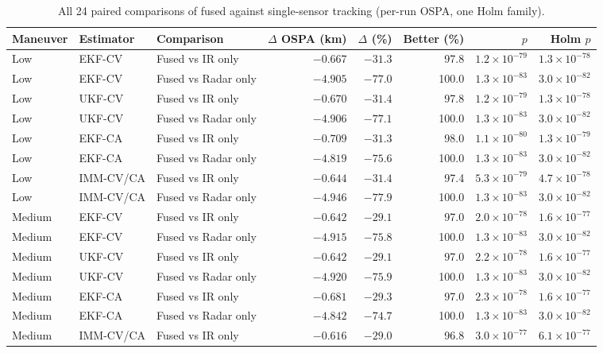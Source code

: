 \begin{table}[!htbp]
\caption{All 24 paired comparisons of fused against single-sensor tracking (per-run OSPA, one Holm family).}
\label{tab:S5}
\centering\footnotesize\setlength{\tabcolsep}{4pt}
\begin{tabular}{@{}lllrrrrr@{}}
\toprule
Maneuver & Estimator & Comparison & $\Delta$ OSPA (km) & $\Delta$ (\%) & Better (\%) & $p$ & Holm $p$ \\
\midrule
Low & EKF-CV & Fused vs IR only & $-0.667$ & $-31.3$ & 97.8 & $1.2\times10^{-79}$ & $1.3\times10^{-78}$ \\
Low & EKF-CV & Fused vs Radar only & $-4.905$ & $-77.0$ & 100.0 & $1.3\times10^{-83}$ & $3.0\times10^{-82}$ \\
Low & UKF-CV & Fused vs IR only & $-0.670$ & $-31.4$ & 97.8 & $1.2\times10^{-79}$ & $1.3\times10^{-78}$ \\
Low & UKF-CV & Fused vs Radar only & $-4.906$ & $-77.1$ & 100.0 & $1.3\times10^{-83}$ & $3.0\times10^{-82}$ \\
Low & EKF-CA & Fused vs IR only & $-0.709$ & $-31.3$ & 98.0 & $1.1\times10^{-80}$ & $1.3\times10^{-79}$ \\
Low & EKF-CA & Fused vs Radar only & $-4.819$ & $-75.6$ & 100.0 & $1.3\times10^{-83}$ & $3.0\times10^{-82}$ \\
Low & IMM-CV/CA & Fused vs IR only & $-0.644$ & $-31.4$ & 97.4 & $5.3\times10^{-79}$ & $4.7\times10^{-78}$ \\
Low & IMM-CV/CA & Fused vs Radar only & $-4.946$ & $-77.9$ & 100.0 & $1.3\times10^{-83}$ & $3.0\times10^{-82}$ \\
\midrule
Medium & EKF-CV & Fused vs IR only & $-0.642$ & $-29.1$ & 97.0 & $2.0\times10^{-78}$ & $1.6\times10^{-77}$ \\
Medium & EKF-CV & Fused vs Radar only & $-4.915$ & $-75.8$ & 100.0 & $1.3\times10^{-83}$ & $3.0\times10^{-82}$ \\
Medium & UKF-CV & Fused vs IR only & $-0.642$ & $-29.1$ & 97.0 & $2.2\times10^{-78}$ & $1.6\times10^{-77}$ \\
Medium & UKF-CV & Fused vs Radar only & $-4.920$ & $-75.9$ & 100.0 & $1.3\times10^{-83}$ & $3.0\times10^{-82}$ \\
Medium & EKF-CA & Fused vs IR only & $-0.681$ & $-29.3$ & 97.0 & $2.3\times10^{-78}$ & $1.6\times10^{-77}$ \\
Medium & EKF-CA & Fused vs Radar only & $-4.842$ & $-74.7$ & 100.0 & $1.3\times10^{-83}$ & $3.0\times10^{-82}$ \\
Medium & IMM-CV/CA & Fused vs IR only & $-0.616$ & $-29.0$ & 96.8 & $3.0\times10^{-77}$ & $6.1\times10^{-77}$ \\

\end{tabular}
\end{table}
